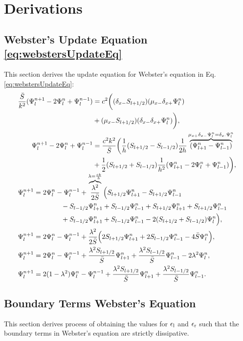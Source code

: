 \chapter{Derivations}\label{app:derivations}
\def\Psilp{\Psi_{l+1}^n}
\def\Psilm{\Psi_{l-1}^n}
\def\Psinp{\Psi_l^{n+1}}
\def\Psinm{\Psi_l^{n-1}}

\section{Webster's Update Equation \eqref{eq:webstersUpdateEq}}\label{app:webstersUpdateEq}
This section derives the update equation for Webster's equation in Eq. \eqref{eq:webstersUpdateEq}:
\begin{align*}
    &\begin{aligned}
    \frac{\Sbar}{k^2}(\Psi_l^{n+1} - 2\Psiln+\Psi_l^{n-1}) &= c^2\bigg((\dxm \Sp)(\mxm \dxp \Psiln)\\
    & + (\mxm \Sp)(\dxm \dxp \Psiln)\bigg),\\
    \Psinp - 2\Psiln+\Psinm &= \frac{c^2k^2}{\Sbar}\bigg(\frac{1}{h}(\Sp - \Sm)\frac{1}{2h}\overbrace{(\Psilp -\Psilm)}^{\mxp\dxm\Psiln = \delta_{x\cdot}\Psiln}\nonumber\\
    &+\frac{1}{2}(\Sp + \Sm)\frac{1}{h^2}(\Psilp-2\Psiln+\Psilm)\bigg),
    \end{aligned}\\[-0.5em]
    &\begin{aligned}
        \Psinp &= 2\Psiln -\Psinm +\overbrace{\frac{\lambda^2}{2\Sbar}}^{\lambda = \frac{ck}{h}}\Big(\Sp\Psilp - \Sp\Psilm\\
        &\qquad\qquad - \Sm\Psilp + \Sm\Psilm+ \Sp\Psilp + \Sp\Psilm \\
        &\qquad\qquad + \Sm\Psilp + \Sm\Psilm - 2 (\Sp + \Sm)\Psiln\Big)\nonumber,\\
        \Psinp &= 2\Psiln-\Psinm+ \frac{\lambda^2}{2\Sbar}\Big(2\Sp\Psilp + 2\Sm\Psilm - 4\Sbar\Psiln\Big)\nonumber,\\
        \Psinp &= 2\Psiln-\Psinm+ \frac{\lambda^2\Sp}{\Sbar}\Psilp + \frac{\lambda^2\Sm}{\Sbar}\Psilm - 2\lambda^2\Psiln\nonumber,\\
        \Psinp &= 2(1-\lambda^2)\Psiln-\Psinm+ \frac{\lambda^2\Sp}{\Sbar}\Psilp + \frac{\lambda^2\Sm}{\Sbar}\Psilm.
    \end{aligned}
\end{align*}

\section{Boundary Terms Webster's Equation}\label{app:boundaryWebster}
This section derives process of obtaining the values for $\epsilon_\text{l}$ and $\epsilon_\text{r}$ such that the boundary terms in Webster's equation are strictly dissipative. 

